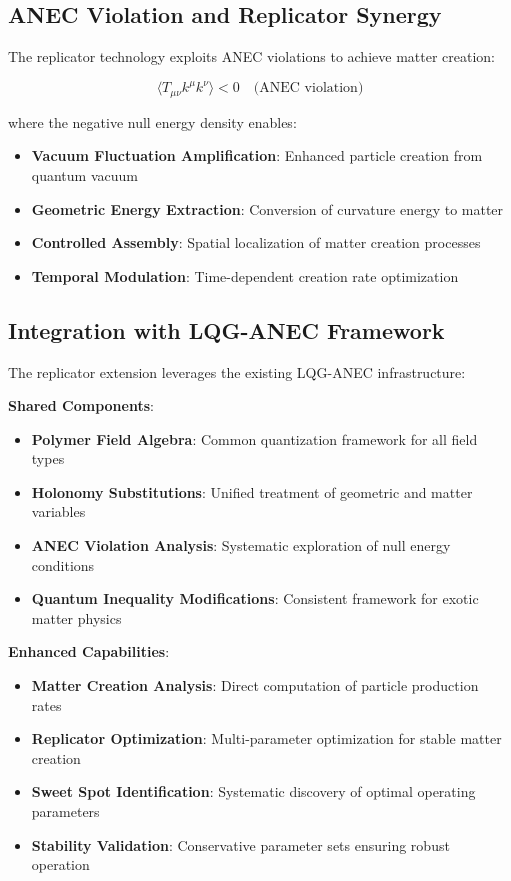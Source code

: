 \documentclass[11pt]{article}
\begin{document}
\subsection{ANEC Violation and Replicator Synergy}

The replicator technology exploits ANEC violations to achieve matter creation:

\begin{equation}
\langle T_{\mu\nu} k^\mu k^\nu \rangle < 0 \quad \text{(ANEC violation)}
\end{equation}

where the negative null energy density enables:
\begin{itemize}
\item \textbf{Vacuum Fluctuation Amplification}: Enhanced particle creation from quantum vacuum
\item \textbf{Geometric Energy Extraction}: Conversion of curvature energy to matter
\item \textbf{Controlled Assembly}: Spatial localization of matter creation processes
\item \textbf{Temporal Modulation}: Time-dependent creation rate optimization
\end{itemize}

\subsection{Integration with LQG-ANEC Framework}

The replicator extension leverages the existing LQG-ANEC infrastructure:

\textbf{Shared Components}:
\begin{itemize}
\item \textbf{Polymer Field Algebra}: Common quantization framework for all field types
\item \textbf{Holonomy Substitutions}: Unified treatment of geometric and matter variables
\item \textbf{ANEC Violation Analysis}: Systematic exploration of null energy conditions
\item \textbf{Quantum Inequality Modifications}: Consistent framework for exotic matter physics
\end{itemize}

\textbf{Enhanced Capabilities}:
\begin{itemize}
\item \textbf{Matter Creation Analysis}: Direct computation of particle production rates
\item \textbf{Replicator Optimization}: Multi-parameter optimization for stable matter creation
\item \textbf{Sweet Spot Identification}: Systematic discovery of optimal operating parameters
\item \textbf{Stability Validation}: Conservative parameter sets ensuring robust operation
\end{itemize}
\end{document}
